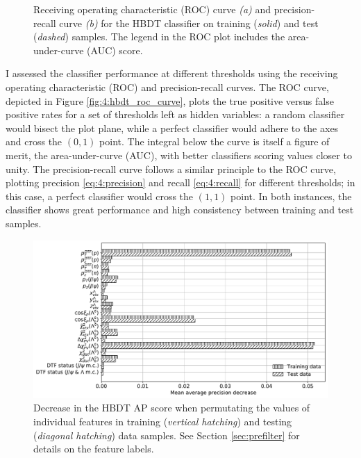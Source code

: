 \begin{figure}
\begin{subfigure}{.45\textwidth}
		\caption{}
		\label{fig:4:hbdt_precall_curve}
	\end{subfigure}
	\caption{Receiving operating characteristic (ROC) curve \textit{(a)} and precision-recall curve \textit{(b)} for the HBDT classifier on training (\textit{solid}) and test (\textit{dashed}) samples. The legend in the ROC plot includes the area-under-curve (AUC) score.}
	\label{fig:4:hbdt_performance_curves}
\end{figure}

I assessed the classifier performance at different thresholds using the receiving operating characteristic (ROC) and precision-recall curves.
The ROC curve, depicted in Figure \ref{fig:4:hbdt_roc_curve}, plots the true positive versus false positive rates for a set of thresholds left as hidden variables:
a random classifier would bisect the plot plane, while a perfect classifier would adhere to the axes and cross the $(0,1)$ point.
The integral below the curve is itself a figure of merit, the area-under-curve (AUC), with better classifiers scoring values closer to unity.
The precision-recall curve follows a similar principle to the ROC curve, plotting precision \eqref{eq:4:precision} and recall \eqref{eq:4:recall} for different thresholds;
in this case, a perfect classifier would cross the $(1,1)$ point.
In both instances, the classifier shows great performance and high consistency between training and test samples.

\begin{figure}
	\centering
	\includegraphics[width=\textwidth]{graphics/04-event_selection/importances.pdf}
	\caption{Decrease in the HBDT AP score when permutating the values of individual features in training (\textit{vertical hatching}) and testing (\textit{diagonal hatching}) data samples. See Section \ref{sec:prefilter} for details on the feature labels.}
	\label{fig:4:hbdt_importances}
\end{figure}

